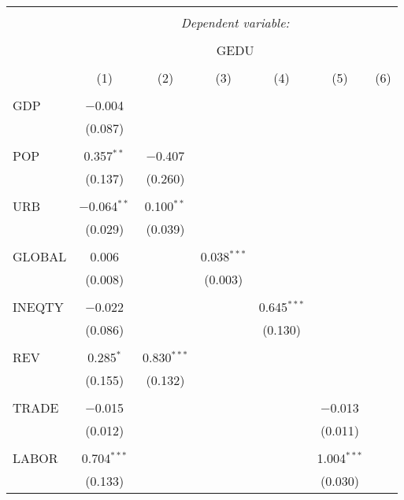 
\begin{table}[!htbp] \centering 
  \caption{} 
  \label{} 
\begin{tabular}{@{\extracolsep{5pt}}lcccccc} 
\\[-1.8ex]\hline 
\hline \\[-1.8ex] 
 & \multicolumn{6}{c}{\textit{Dependent variable:}} \\ 
\cline{2-7} 
\\[-1.8ex] & \multicolumn{6}{c}{GEDU} \\ 
\\[-1.8ex] & (1) & (2) & (3) & (4) & (5) & (6)\\ 
\hline \\[-1.8ex] 
 GDP & $-$0.004 &  &  &  &  &  \\ 
  & (0.087) &  &  &  &  &  \\ 
  & & & & & & \\ 
 POP & 0.357$^{**}$ & $-$0.407 &  &  &  &  \\ 
  & (0.137) & (0.260) &  &  &  &  \\ 
  & & & & & & \\ 
 URB & $-$0.064$^{**}$ & 0.100$^{**}$ &  &  &  &  \\ 
  & (0.029) & (0.039) &  &  &  &  \\ 
  & & & & & & \\ 
 GLOBAL & 0.006 &  & 0.038$^{***}$ &  &  &  \\ 
  & (0.008) &  & (0.003) &  &  &  \\ 
  & & & & & & \\ 
 INEQTY & $-$0.022 &  &  & 0.645$^{***}$ &  &  \\ 
  & (0.086) &  &  & (0.130) &  &  \\ 
  & & & & & & \\ 
 REV & 0.285$^{*}$ & 0.830$^{***}$ &  &  &  &  \\ 
  & (0.155) & (0.132) &  &  &  &  \\ 
  & & & & & & \\ 
 TRADE & $-$0.015 &  &  &  & $-$0.013 &  \\ 
  & (0.012) &  &  &  & (0.011) &  \\ 
  & & & & & & \\ 
 LABOR & 0.704$^{***}$ &  &  &  & 1.004$^{***}$ &  \\ 
  & (0.133) &  &  &  & (0.030) &  \\ 

\end{tabular}
\end{table}
